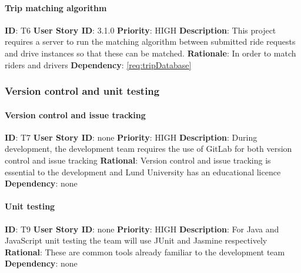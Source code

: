 \documentclass{article}
\begin{document}
\paragraph{Trip matching algorithm}\label{req:matchAlgorithm}
\textbf{ID}: T6\newline
\textbf{User Story ID}: 3.1.0\newline
\textbf{Priority}: HIGH\newline
\textbf{Description}: This project requires a server to run the matching algorithm between submitted ride requests and drive instances so that these can be matched.\newline
\textbf{Rationale}: In order to match riders and drivers\newline
\textbf{Dependency}: \ref{req:tripDatabase}

\subsubsection{Version control and unit testing}
\paragraph{Version control and issue tracking}\label{req:git}
\textbf{ID}: T7\newline
\textbf{User Story ID}: none \newline
\textbf{Priority}: HIGH\newline
\textbf{Description}: During development, the development team requires the use of GitLab for both version control and issue tracking\newline
\textbf{Rational}: Version control and issue tracking is essential to the development and Lund University has an educational licence\newline
\textbf{Dependency}: none\newline

\paragraph{Unit testing}\label{req:unittesting}
\textbf{ID}: T9\newline
\textbf{User Story ID}: none\newline
\textbf{Priority}: HIGH\newline
\textbf{Description}: For Java and JavaScript unit testing the team will use JUnit and Jasmine respectively \newline
\textbf{Rational}: These are common tools already familiar to the development team\newline
\textbf{Dependency}: none\newline
\end{document}

